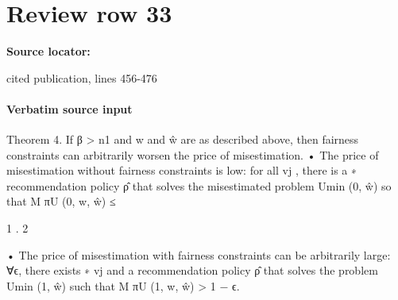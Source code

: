 \documentclass[10pt]{article}
\begin{document}
\section*{Review row 33}
\textbf{Source locator:} {\footnotesize\raggedright cited publication, lines 456-\allowbreak{}476\par}
\paragraph{Verbatim source input}
\begin{ReviewVerbatim}
Theorem 4. If β > n1 and w and ŵ are as described above, then fairness constraints can arbitrarily
worsen the price of misestimation.
• The price of misestimation without fairness constraints is low: for all {vj }, there is a
∗
recommendation policy ρ̂ that solves the misestimated problem Umin
(0, ŵ) so that
M
πU
(0, w, ŵ) ≤

1
.
2

• The price of misestimation with fairness constraints can be arbitrarily large: ∀ϵ, there exists
∗
{vj } and a recommendation policy ρ̂ that solves the problem Umin
(1, ŵ) such that
M
πU
(1, w, ŵ) > 1 − ϵ.
\end{ReviewVerbatim}
\end{document}
